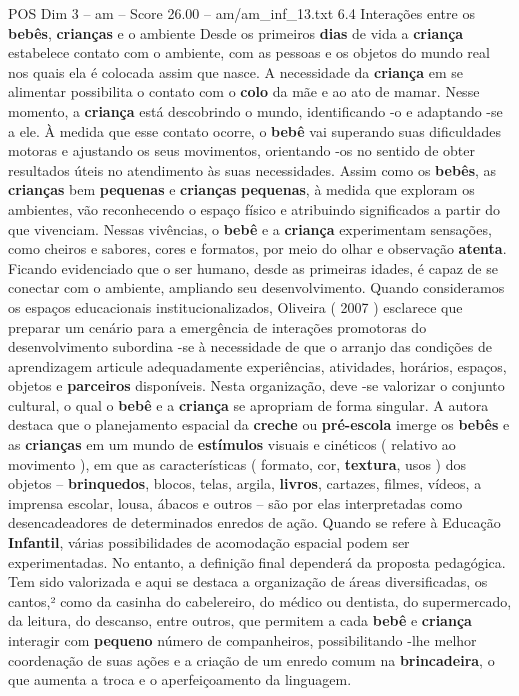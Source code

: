 \begin{textsample}{POS Dim 3 – am – Score 26.00 – am/am\_inf\_13.txt}  \label{ex:f3_pos_039}
6.4 Interações entre os \textbf{bebês}, \textbf{crianças} e o ambiente Desde os primeiros \textbf{dias} de vida a \textbf{criança} estabelece contato com o ambiente, com as pessoas e os objetos do mundo real nos quais ela é colocada assim que nasce.
A necessidade da \textbf{criança} em se alimentar possibilita o contato com o \textbf{colo} da mãe e ao ato de mamar.
Nesse momento, a \textbf{criança} está descobrindo o mundo, identificando -o e adaptando -se a ele.
À medida que esse contato ocorre, o \textbf{bebê} vai superando suas dificuldades motoras e ajustando os seus movimentos, orientando -os no sentido de obter resultados úteis no atendimento às suas necessidades.
Assim como os \textbf{bebês}, as \textbf{crianças} bem \textbf{pequenas} e \textbf{crianças} \textbf{pequenas}, à medida que exploram os ambientes, vão reconhecendo o espaço físico e atribuindo significados a partir do que vivenciam.
Nessas vivências, o \textbf{bebê} e a \textbf{criança} experimentam sensações, como cheiros e sabores, cores e formatos, por meio do olhar e observação \textbf{atenta}.
Ficando evidenciado que o ser humano, desde as primeiras idades, é capaz de se conectar com o ambiente, ampliando seu desenvolvimento.
Quando consideramos os espaços educacionais institucionalizados, Oliveira ( 2007 ) esclarece que preparar um cenário para a emergência de interações promotoras do desenvolvimento subordina -se à necessidade de que o arranjo das condições de aprendizagem articule adequadamente experiências, atividades, horários, espaços, objetos e \textbf{parceiros} disponíveis.
Nesta organização, deve -se valorizar o conjunto cultural, o qual o \textbf{bebê} e a \textbf{criança} se apropriam de forma singular.
A autora destaca que o planejamento espacial da \textbf{creche} ou \textbf{pré-escola} imerge os \textbf{bebês} e as \textbf{crianças} em um mundo de \textbf{estímulos} visuais e cinéticos ( relativo ao movimento ), em que as características ( formato, cor, \textbf{textura}, usos ) dos objetos – \textbf{brinquedos}, blocos, telas, argila, \textbf{livros}, cartazes, filmes, vídeos, a imprensa escolar, lousa, ábacos e outros – são por elas interpretadas como desencadeadores de determinados enredos de ação.
Quando se refere à Educação \textbf{Infantil}, várias possibilidades de acomodação espacial podem ser experimentadas.
No entanto, a definição final dependerá da proposta pedagógica.
Tem sido valorizada e aqui se destaca a organização de áreas diversificadas, os cantos,² como da casinha do cabelereiro, do médico ou dentista, do supermercado, da leitura, do descanso, entre outros, que permitem a cada \textbf{bebê} e \textbf{criança} interagir com \textbf{pequeno} número de companheiros, possibilitando -lhe melhor coordenação de suas ações e a criação de um enredo comum na \textbf{brincadeira}, o que aumenta a troca e o aperfeiçoamento da linguagem.

\end{textsample}
